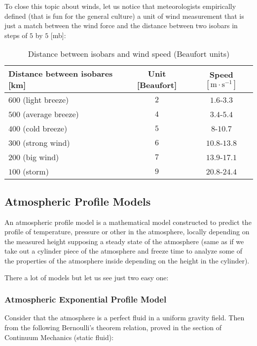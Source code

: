 	To close this topic about winds, let us notice that meteorologists empirically defined (that is fun for the general culture) a unit of wind measurement that is just a match between the wind force and the distance between two isobars in steps of $5$ by $5$ [mb]:
	\begin{table}[H]
		\begin{center}
		\begin{tabular}{|l||c|c|}
			\hline
			{\cellcolor{black!30}Distance between isobares [km]} & {\cellcolor{black!30}Unit [Beaufort]} & {\cellcolor{black!30}Speed $[\text{m}\cdot \text{s}^{-1}]$}  \\ \hline
			$600$ (light breeze) & $2$ & $1.6$-$3.3$\\ \hline
			$500$ (average breeze) & $4$ & $3.4$-$5.4$\\ \hline
			$400$ (cold breeze) & $5$ & $8$-$10.7$\\ \hline
			$300$ (strong wind) & $6$ & $10.8$-$13.8$\\ \hline
			$200$ (big wind) & $7$ & $13.9$-$17.1$\\ \hline
			$100$ (storm) & $9$ & $20.8$-$24.4$\\ \hline
		\end{tabular}
		\end{center}
		\caption{Distance between isobars and wind speed (Beaufort units)}
	\end{table}
	
	\subsection{Atmospheric Profile Models}
	An atmospheric profile model is a mathematical model constructed to predict the profile of temperature, pressure or other in the atmosphere, locally depending on the measured height supposing a steady state of the atmosphere (same as if we take out a cylinder piece of the atmosphere and freeze time to analyze some of the properties of the atmosphere inside depending on the height in the cylinder). 

	There a lot of models but let us see just two easy one:
	
	\subsubsection{Atmospheric Exponential Profile Model}
	Consider that the atmosphere is a perfect fluid in a uniform gravity field. Then from the following Bernoulli's theorem relation, proved in the section of Continuum Mechanics (static fluid):
	
